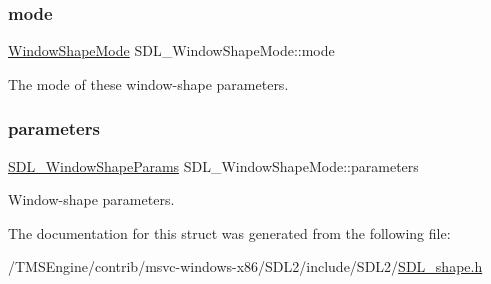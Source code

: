 \subsubsection{\texorpdfstring{mode}{mode}}
{\footnotesize\ttfamily \hyperlink{_s_d_l__shape_8h_aa30948f2699e316a43b740eccebe5c20}{Window\+Shape\+Mode} S\+D\+L\+\_\+\+Window\+Shape\+Mode\+::mode}



The mode of these window-\/shape parameters. 

\mbox{\label{struct_s_d_l___window_shape_mode_a2f79bb294034156207fa6d88d3a8c819}} 
\subsubsection{\texorpdfstring{parameters}{parameters}}
{\footnotesize\ttfamily \hyperlink{union_s_d_l___window_shape_params}{S\+D\+L\+\_\+\+Window\+Shape\+Params} S\+D\+L\+\_\+\+Window\+Shape\+Mode\+::parameters}



Window-\/shape parameters. 



The documentation for this struct was generated from the following file\+:\begin{DoxyCompactItemize}
\item 
/\+T\+M\+S\+Engine/contrib/msvc-\/windows-\/x86/\+S\+D\+L2/include/\+S\+D\+L2/\hyperlink{_s_d_l__shape_8h}{S\+D\+L\+\_\+shape.\+h}\end{DoxyCompactItemize}
